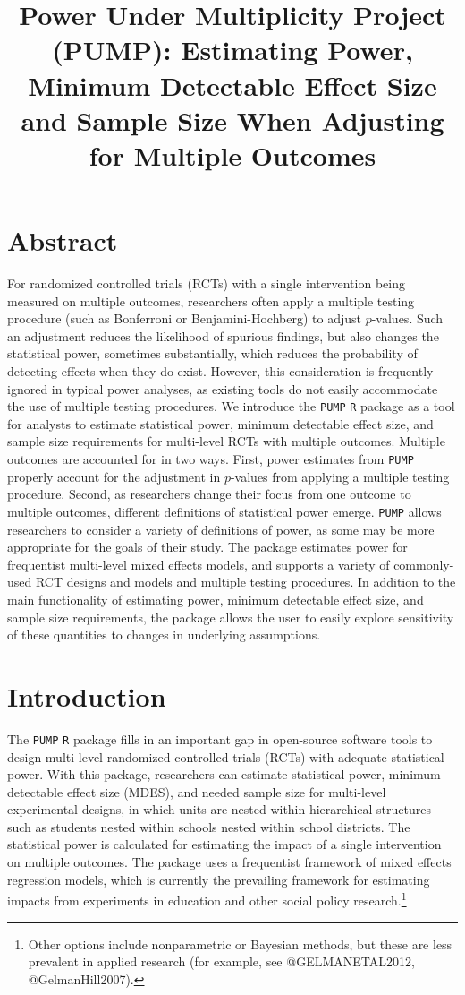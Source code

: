 \documentclass[
]{article}
\title{Power Under Multiplicity Project (PUMP): Estimating Power,
Minimum Detectable Effect Size and Sample Size When Adjusting for
Multiple Outcomes}
\author{}
\date{\vspace{-2.5em}}
\begin{document}
\maketitle

\section*{Abstract}

For randomized controlled trials (RCTs) with a single intervention being
measured on multiple outcomes, researchers often apply a multiple
testing procedure (such as Bonferroni or Benjamini-Hochberg) to adjust
\(p\)-values. Such an adjustment reduces the likelihood of spurious
findings, but also changes the statistical power, sometimes
substantially, which reduces the probability of detecting effects when
they do exist. However, this consideration is frequently ignored in
typical power analyses, as existing tools do not easily accommodate the
use of multiple testing procedures. We introduce the \texttt{PUMP}
\texttt{R} package as a tool for analysts to estimate statistical power,
minimum detectable effect size, and sample size requirements for
multi-level RCTs with multiple outcomes. Multiple outcomes are accounted
for in two ways. First, power estimates from \texttt{PUMP} properly
account for the adjustment in \(p\)-values from applying a multiple
testing procedure. Second, as researchers change their focus from one
outcome to multiple outcomes, different definitions of statistical power
emerge. \texttt{PUMP} allows researchers to consider a variety of
definitions of power, as some may be more appropriate for the goals of
their study. The package estimates power for frequentist multi-level
mixed effects models, and supports a variety of commonly-used RCT
designs and models and multiple testing procedures. In addition to the
main functionality of estimating power, minimum detectable effect size,
and sample size requirements, the package allows the user to easily
explore sensitivity of these quantities to changes in underlying
assumptions.

\section{Introduction}
\label{sec:intro}

The \texttt{PUMP} \texttt{R} package fills in an important gap in
open-source software tools to design multi-level randomized controlled
trials (RCTs) with adequate statistical power. With this package,
researchers can estimate statistical power, minimum detectable effect
size (MDES), and needed sample size for multi-level experimental
designs, in which units are nested within hierarchical structures such
as students nested within schools nested within school districts. The
statistical power is calculated for estimating the impact of a single
intervention on multiple outcomes. The package uses a frequentist
framework of mixed effects regression models, which is currently the
prevailing framework for estimating impacts from experiments in
education and other social policy
research.\footnote{Other options include nonparametric or Bayesian methods, but these are less prevalent in applied research (for example, see @GELMANETAL2012, @GelmanHill2007).}
\end{document}
